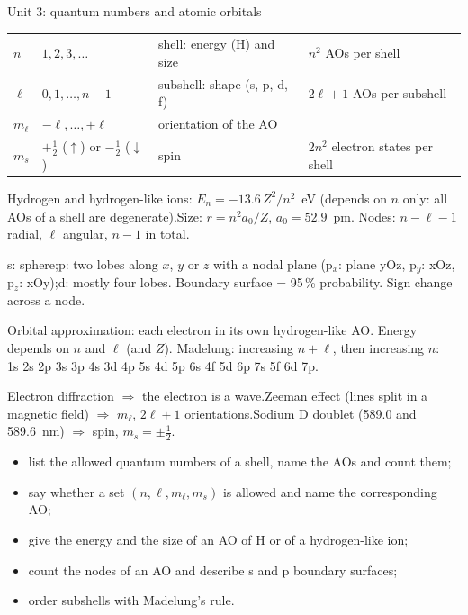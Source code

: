 \clearpage
\begin{recap}{Unit 3: quantum numbers and atomic orbitals}
\begin{tabular}{@{}l l l l@{}}
$n$ & $1, 2, 3, \dots$ & shell: energy (H) and size & $n^2$ AOs per shell\\
$\ell$ & $0, 1, \dots, n-1$ & subshell: shape (s, p, d, f) & $2\ell+1$ AOs per subshell\\
$m_\ell$ & $-\ell, \dots, +\ell$ & orientation of the AO & \\
$m_s$ & $+\frac12$ ($\uparrow$) or $-\frac12$ ($\downarrow$) & spin & $2n^2$ electron states per shell
\end{tabular}

Hydrogen and hydrogen-like ions: $E_n = -13.6\,Z^2/n^2$~eV (depends on $n$ only: all AOs of a shell
are degenerate).\quad Size: $r = n^2 a_0/Z$, $a_0 = 52.9$~pm.\quad
Nodes: $n-\ell-1$ radial, $\ell$ angular, $n-1$ in total.

s: sphere;\quad p: two lobes along $x$, $y$ or $z$ with a nodal plane (p$_x$: plane yOz, p$_y$: xOz,
p$_z$: xOy);\quad d: mostly four lobes. Boundary surface = 95\,\% probability. Sign change across a node.

Orbital approximation: each electron in its own hydrogen-like AO. Energy depends on $n$ and $\ell$
(and $Z$). Madelung: increasing $n+\ell$, then increasing $n$:\\
1s 2s 2p 3s 3p 4s 3d 4p 5s 4d 5p 6s 4f 5d 6p 7s 5f 6d 7p.

Electron diffraction $\Rightarrow$ the electron is a wave.\quad Zeeman effect (lines split in a
magnetic field) $\Rightarrow$ $m_\ell$, $2\ell+1$ orientations.\quad Sodium D doublet (589.0 and
589.6~nm) $\Rightarrow$ spin, $m_s = \pm\frac12$.

\begin{itemize}
  \item list the allowed quantum numbers of a shell, name the AOs and count them;
  \item say whether a set $(n, \ell, m_\ell, m_s)$ is allowed and name the corresponding AO;
  \item give the energy and the size of an AO of H or of a hydrogen-like ion;
  \item count the nodes of an AO and describe s and p boundary surfaces;
  \item order subshells with Madelung's rule.
\end{itemize}
\end{recap}
